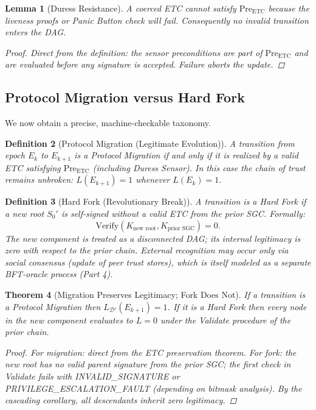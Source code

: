 \documentclass[11pt,a4paper]{article}
\newtheorem{theorem}{Theorem}[section]
\newtheorem{lemma}[theorem]{Lemma}
\newtheorem{definition}[theorem]{Definition}
\begin{document}
\begin{lemma}[Duress Resistance]
A coerced ETC cannot satisfy \(\text{Pre}_{\text{ETC}}\) because the liveness proofs or Panic Button check will fail. Consequently no invalid transition enters the DAG.

\begin{proof}
Direct from the definition: the sensor preconditions are part of \(\text{Pre}_{\text{ETC}}\) and are evaluated before any signature is accepted. Failure aborts the update.
\end{proof}
\end{lemma}

\subsection{Protocol Migration versus Hard Fork}

We now obtain a precise, machine-checkable taxonomy.

\begin{definition}[Protocol Migration (Legitimate Evolution)]
A transition from epoch \(E_k\) to \(E_{k+1}\) is a \emph{Protocol Migration} if and only if it is realized by a valid ETC satisfying \(\text{Pre}_{\text{ETC}}\) (including Duress Sensor). In this case the chain of trust remains unbroken: \(L(E_{k+1}) = 1\) whenever \(L(E_k) = 1\).
\end{definition}

\begin{definition}[Hard Fork (Revolutionary Break)]
A transition is a \emph{Hard Fork} if a new root \(S_0'\) is self-signed without a valid ETC from the prior SGC. Formally:
\[
\text{Verify}(K_{\text{new root}}, K_{\text{prior SGC}}) = 0.
\]
The new component is treated as a disconnected DAG; its internal legitimacy is zero with respect to the prior chain. External recognition may occur only via social consensus (update of peer trust stores), which is itself modeled as a separate BFT-oracle process (Part 4).
\end{definition}

\begin{theorem}[Migration Preserves Legitimacy; Fork Does Not]
If a transition is a Protocol Migration then \(L_{\mathcal{D}'}(E_{k+1}) = 1\). If it is a Hard Fork then every node in the new component evaluates to \(L = 0\) under the Validate procedure of the prior chain.

\begin{proof}
For migration: direct from the ETC preservation theorem. For fork: the new root has no valid parent signature from the prior SGC; the first check in Validate fails with INVALID\_SIGNATURE or PRIVILEGE\_ESCALATION\_FAULT (depending on bitmask analysis). By the cascading corollary, all descendants inherit zero legitimacy.
\end{proof}
\end{theorem}
\end{document}
